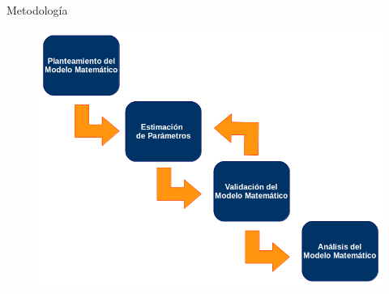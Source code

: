 \begin{frame}{Metodología}
\begin{figure}[h]
	\includegraphics[width=\textwidth]{FLOWCHART}
\end{figure}
\end{frame}


